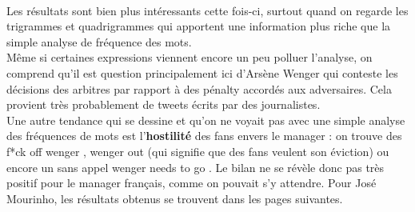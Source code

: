 \documentclass[14pt, openany]{article}
\begin{document}
\paragraph{}
Les résultats sont bien plus intéressants cette fois-ci, surtout quand on regarde les trigrammes et quadrigrammes qui apportent une information plus riche que la simple analyse de fréquence des mots.\\
Même si certaines expressions viennent encore un peu \og polluer \fg{} l'analyse, on comprend qu'il est question principalement ici d'Arsène Wenger qui conteste les décisions des arbitres par rapport à des pénalty accordés aux adversaires. Cela provient très probablement de tweets écrits par des journalistes.\\
Une autre tendance qui se dessine et qu'on ne voyait pas avec une simple analyse des fréquences de mots est l'\textbf{hostilité} des fans envers le manager : on trouve des \og f*ck off wenger \fg{}, \og wenger out \fg{} (qui signifie que des fans veulent son éviction) ou encore un sans appel \og wenger needs to go \fg{}. Le bilan ne se révèle donc pas très positif pour le manager français, comme on pouvait s'y attendre. Pour José Mourinho, les résultats obtenus se trouvent dans les pages suivantes.
\end{document}
